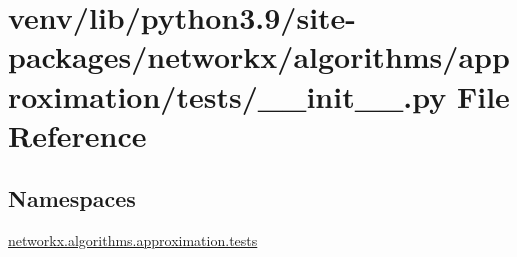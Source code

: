 \hypertarget{venv_2lib_2python3_89_2site-packages_2networkx_2algorithms_2approximation_2tests_2____init_____8py}{}\section{venv/lib/python3.9/site-\/packages/networkx/algorithms/approximation/tests/\+\_\+\+\_\+init\+\_\+\+\_\+.py File Reference}
\label{venv_2lib_2python3_89_2site-packages_2networkx_2algorithms_2approximation_2tests_2____init_____8py}
\subsection*{Namespaces}
\begin{DoxyCompactItemize}
\item 
 \hyperlink{namespacenetworkx_1_1algorithms_1_1approximation_1_1tests}{networkx.\+algorithms.\+approximation.\+tests}
\end{DoxyCompactItemize}
